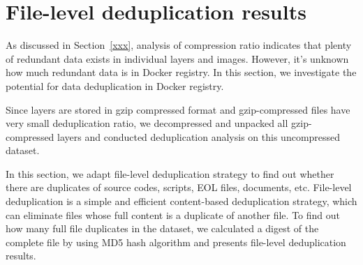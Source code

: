 \section{File-level deduplication results}
\label{sec:redundant_files}


As discussed in Section~\ref{xxx}, analysis of compression ratio indicates that plenty of redundant data exists in individual layers and images. However, it's unknown how much redundant data is in Docker registry. In this section, we investigate the potential for data deduplication in Docker registry. 

Since layers are stored in gzip compressed format and gzip-compressed files have very small deduplication ratio\cite{xxxx}, we decompressed and unpacked all gzip-compressed layers and conducted deduplication analysis on this uncompressed dataset. 

In this section, we adapt file-level deduplication strategy to find out whether there are duplicates of source codes, scripts, EOL files, documents, etc. File-level deduplication is a simple and efficient content-based deduplication strategy, which can eliminate files whose full content is a duplicate of another file. To find out how many full file duplicates in the dataset, we calculated a digest of the complete file by using MD5 hash algorithm and presents file-level deduplication results.




